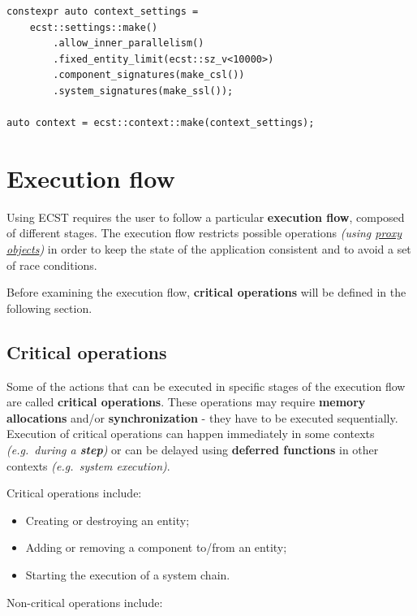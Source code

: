 \documentclass[twoside, 12pt, a4paper, openright]{book}
\begin{document}
\begin{verbatim}
constexpr auto context_settings =
    ecst::settings::make()
        .allow_inner_parallelism()
        .fixed_entity_limit(ecst::sz_v<10000>)
        .component_signatures(make_csl())
        .system_signatures(make_ssl());

auto context = ecst::context::make(context_settings);
\end{verbatim}

\hypertarget{chap_flow}{\chapter{Execution flow}\label{chap_flow}}

Using ECST requires the user to follow a particular \textbf{execution
flow}, composed of different stages. The execution flow restricts
possible operations \emph{(using \protect\hyperlink{chap_proxies}{proxy
objects})} in order to keep the state of the application consistent and
to avoid a set of race conditions.

Before examining the execution flow, \textbf{critical operations} will
be defined in the following section.

\section{Critical operations}\label{critical-operations}

Some of the actions that can be executed in specific stages of the
execution flow are called \textbf{critical operations}. These operations
may require \textbf{memory allocations} and/or \textbf{synchronization}
- they have to be executed sequentially. Execution of critical
operations can happen immediately in some contexts \emph{(e.g.~during a
\textbf{step})} or can be delayed using \textbf{deferred functions} in
other contexts \emph{(e.g.~system execution)}.

Critical operations include:

\begin{itemize}
\item
  Creating or destroying an entity;
\item
  Adding or removing a component to/from an entity;
\item
  Starting the execution of a system chain.
\end{itemize}

Non-critical operations include:
\end{document}
